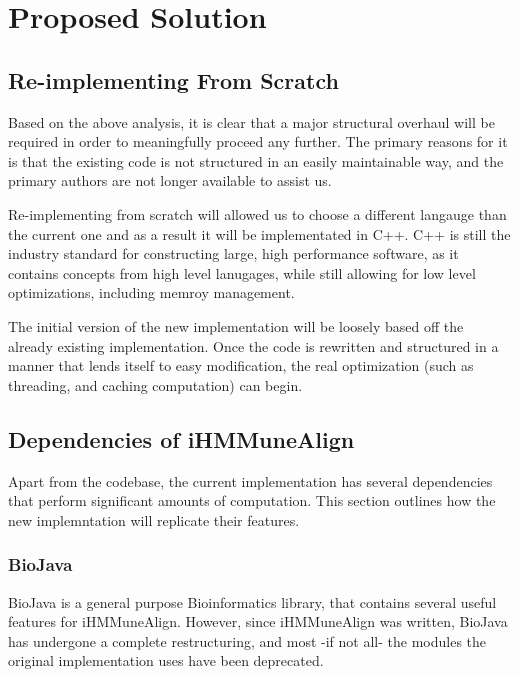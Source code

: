 \documentclass[a4paper,12pt]{report}
\begin{document}
\chapter{Proposed Solution}

\section{Re-implementing From Scratch}
Based on the above analysis, it is clear that a major structural overhaul will be required in order to meaningfully proceed any further. The primary reasons for it is that the existing code is not structured in an easily maintainable way, and the primary authors are not longer available to assist us. 

Re-implementing from scratch will allowed us to choose a different langauge than the current one and as a result it will be implementated in C++. C++ is still the industry standard for constructing large, high performance software\autocite{cpp}, as it contains concepts from high level lanugages, while still allowing for low level optimizations, including memroy management. 

The initial version of the new implementation will be loosely based off the already existing implementation. Once the code is rewritten and structured in a manner that lends itself to easy modification, the real optimization (such as threading, and caching computation) can begin.

\section{Dependencies of iHMMuneAlign}
Apart from the codebase, the current implementation has several dependencies that perform significant amounts of computation. This section outlines how the new implemntation will replicate their features.

\subsection{BioJava}
BioJava \autocite{biojava}is a general purpose Bioinformatics library, that contains several useful features for iHMMuneAlign. However, since iHMMuneAlign was written, BioJava has undergone a complete restructuring, and most -if not all- the modules the original implementation uses have been deprecated.
\end{document}
